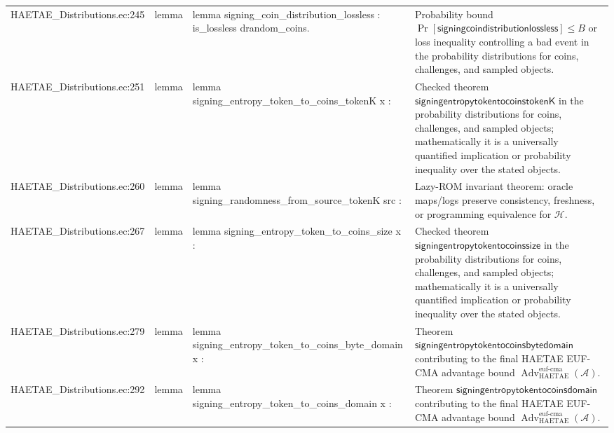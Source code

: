 \documentclass[10pt]{article}
\newcommand{\Adv}{\operatorname{Adv}}
\begin{document}
\begin{longtable}{L{0.11\textwidth}L{0.055\textwidth}L{0.385\textwidth}L{0.41\textwidth}}
HAETAE\_\allowbreak{}Distributions.\allowbreak{}ec:\allowbreak{}245 & lemma & {\ttfamily\scriptsize lemma signing\_\allowbreak{}coin\_\allowbreak{}distribution\_\allowbreak{}lossless : is\_\allowbreak{}lossless drandom\_\allowbreak{}coins.} & Probability bound $\Pr[\mathsf{signingcoindistributionlossless}]\le B$ or loss inequality controlling a bad event in the probability distributions for coins, challenges, and sampled objects. \\
HAETAE\_\allowbreak{}Distributions.\allowbreak{}ec:\allowbreak{}251 & lemma & {\ttfamily\scriptsize lemma signing\_\allowbreak{}entropy\_\allowbreak{}token\_\allowbreak{}to\_\allowbreak{}coins\_\allowbreak{}tokenK x :} & Checked theorem $\mathsf{signingentropytokentocoinstokenK}$ in the probability distributions for coins, challenges, and sampled objects; mathematically it is a universally quantified implication or probability inequality over the stated objects. \\
HAETAE\_\allowbreak{}Distributions.\allowbreak{}ec:\allowbreak{}260 & lemma & {\ttfamily\scriptsize lemma signing\_\allowbreak{}randomness\_\allowbreak{}from\_\allowbreak{}source\_\allowbreak{}tokenK src :} & Lazy-ROM invariant theorem: oracle maps/logs preserve consistency, freshness, or programming equivalence for $\mathcal H$. \\
HAETAE\_\allowbreak{}Distributions.\allowbreak{}ec:\allowbreak{}267 & lemma & {\ttfamily\scriptsize lemma signing\_\allowbreak{}entropy\_\allowbreak{}token\_\allowbreak{}to\_\allowbreak{}coins\_\allowbreak{}size x :} & Checked theorem $\mathsf{signingentropytokentocoinssize}$ in the probability distributions for coins, challenges, and sampled objects; mathematically it is a universally quantified implication or probability inequality over the stated objects. \\
HAETAE\_\allowbreak{}Distributions.\allowbreak{}ec:\allowbreak{}279 & lemma & {\ttfamily\scriptsize lemma signing\_\allowbreak{}entropy\_\allowbreak{}token\_\allowbreak{}to\_\allowbreak{}coins\_\allowbreak{}byte\_\allowbreak{}domain x :} & Theorem $\mathsf{signingentropytokentocoinsbytedomain}$ contributing to the final HAETAE EUF-CMA advantage bound $\Adv_{\mathrm{HAETAE}}^{\mathrm{euf\mbox{-}cma}}(\mathcal A)$. \\
HAETAE\_\allowbreak{}Distributions.\allowbreak{}ec:\allowbreak{}292 & lemma & {\ttfamily\scriptsize lemma signing\_\allowbreak{}entropy\_\allowbreak{}token\_\allowbreak{}to\_\allowbreak{}coins\_\allowbreak{}domain x :} & Theorem $\mathsf{signingentropytokentocoinsdomain}$ contributing to the final HAETAE EUF-CMA advantage bound $\Adv_{\mathrm{HAETAE}}^{\mathrm{euf\mbox{-}cma}}(\mathcal A)$. \\

\end{longtable}
\end{document}
